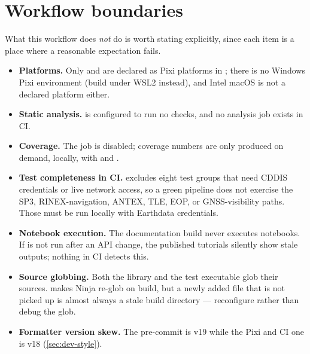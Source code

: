 \section{Workflow boundaries}
\label{sec:dev-boundaries}

What this workflow does \emph{not} do is worth stating explicitly, since each
item is a place where a reasonable expectation fails.

\begin{itemize}[leftmargin=1.4em]
  \item \textbf{Platforms.} Only  and  are
    declared as Pixi platforms in ; there is no Windows Pixi
    environment (build under WSL2 instead), and Intel macOS is not a declared
    platform either.
  \item \textbf{Static analysis.}  is configured to run no
    checks, and no analysis job exists in CI.
  \item \textbf{Coverage.} The  job is disabled; coverage
    numbers are only produced on demand, locally, with  and
    .
  \item \textbf{Test completeness in CI.}  excludes eight
    test groups that need CDDIS credentials or live network access, so a green
    pipeline does not exercise the SP3, RINEX-navigation, ANTEX, TLE, EOP, or
    GNSS-visibility paths. Those must be run locally with Earthdata
    credentials.
  \item \textbf{Notebook execution.} The documentation build never executes
    notebooks. If  is not run after an API change, the
    published tutorials silently show stale outputs; nothing in CI detects this.
  \item \textbf{Source globbing.} Both the library and the test executable glob
    their sources.  makes Ninja re-glob on build, but
    a newly added file that is not picked up is almost always a stale build
    directory --- reconfigure rather than debug the glob.
  \item \textbf{Formatter version skew.} The pre-commit  is
    v19 while the Pixi and CI one is v18 (\cref{sec:dev-style}).
\end{itemize}
